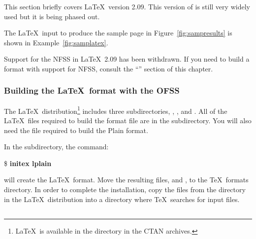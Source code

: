 This section briefly covers \LaTeX\ version 2.09.  This version of
 is still very 
widely used but it is being phased out.

The \LaTeX\ input to produce the sample page in Figure~\ref{fig:sampresults}
is shown in Example~\ref{fig:samplatex}.  

\newpage
{}

Support for the NFSS in \LaTeX\ 2.09 has been withdrawn.  If you need
to build a format with support for NFSS, consult the ``''
section of this chapter.

\subsubsection{Building the \protect\LaTeX\ format with the OFSS}
\label{sec:buildlatexofss}

The \LaTeX\ distribution\footnote{\LaTeX\ is available in the
 directory in the CTAN archives.}
includes three subdirectories, , , and
.  All of the \LaTeX\ files required to
build the format file 
are in the  subdirectory.  You will also need the
 file  required 
to build the Plain format.

In the  subdirectory, the command:

\begin{ttindent}
\$ \textbf{initex lplain}
\end{ttindent}

will create the \LaTeX\ format.  Move the resulting files,
  and 
, to the \TeX\ formats
directory.  In order to complete the installation, copy the files from the
 directory in the \LaTeX\ distribution into a directory where
\TeX\ searches for input files.

\subsection{\protect\AMSTeX}

